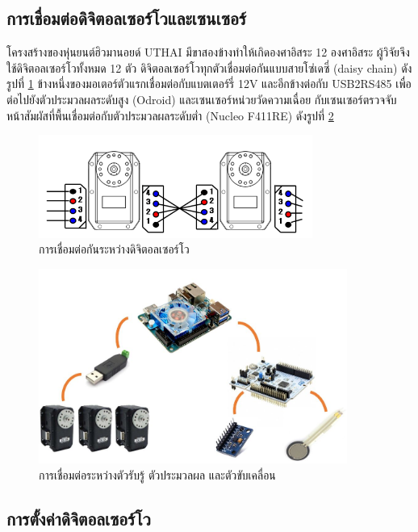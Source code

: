 \subsection{การเชื่อมต่อดิจิตอลเซอร์โวและเซนเซอร์}
โครงสร้างของหุ่นยนต์ฮิวมานอยด์ UTHAI มีขาสองข้างทำให้เกิดองศาอิสระ 12 องศาอิสระ
ผู้วิจัยจึงใช้ดิจิตอลเซอร์โวทั้งหมด 12 ตัว ดิจิตอลเซอร์โวทุกตัวเชื่อมต่อกันแบบสายโซ่เดซี่ (daisy chain) ดังรูปที่ \ref{fig:dynamixel_connect}
ข้างหนึ่งของมอเตอร์ตัวแรกเชื่อมต่อกับแบตเตอร์รี่ 12V และอีกข้างต่อกับ USB2RS485 เพื่อต่อไปยังตัวประมวลผลระดับสูง (Odroid)
และเซนเซอร์หน่วยวัดความเฉื่อย กับเซนเซอร์ตรวจจับหน้าสัมผัสที่พื้นเชื่อมต่อกับตัวประมวลผลระดับต่ำ (Nucleo F411RE)
ดังรูปที่ \ref{fig:odroid2dynamixel}
\begin{figure}[!ht]
    \centering
    \includegraphics[width=0.8\textwidth]{chapter3/images/dynamixel_connect.png}
    \caption{การเชื่อมต่อกันระหว่างดิจิตอลเซอร์โว}
    \label{fig:dynamixel_connect}
\end{figure}
\begin{figure}[!ht]
    \centering
    \includegraphics[width=0.9\textwidth]{chapter3/images/odroid2dynamixel.JPG}
    \caption{การเชื่อมต่อระหว่างตัวรับรู้ ตัวประมวลผล และตัวขับเคลื่อน}
    \label{fig:odroid2dynamixel}
\end{figure}


\clearpage
\subsection{การตั้งค่าดิจิตอลเซอร์โว}

